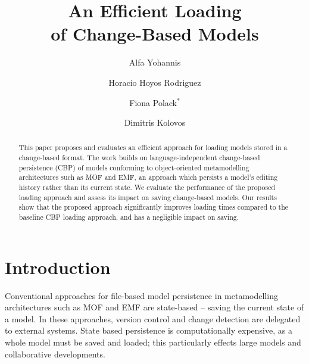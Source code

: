 \documentclass{llncs}
\begin{document}
    \renewcommand{\thelstlisting}{\arabic{lstlisting}}
    \renewcommand{\labelitemi}{$\bullet$}
    \newcommand{\dk}[1]{\textbf{[DK: #1]}}
    
    \title{An Efficient Loading \\ of Change-Based Models}
    \author{
Alfa Yohannis \and Horacio Hoyos Rodriguez \and Fiona Polack$^*$ \and Dimitris Kolovos
    }
    
    
    \maketitle      %
    \begin{abstract}
This paper proposes and evaluates an efficient approach for loading models stored in a change-based format. The work builds on language-independent change-based persistence (CBP) of models conforming to object-oriented metamodelling architectures such as MOF and EMF, an approach which persists a model's editing history rather than its current state. We evaluate the performance of the proposed loading approach and assess its impact on saving change-based models. Our results show that the proposed approach significantly improves loading times compared to the baseline CBP loading approach, and has a negligible impact on saving.

    \end{abstract}
    
    \section{Introduction}
    \label{sec:introduction}
    Conventional approaches for file-based model persistence in metamodelling architectures such as MOF \cite{omg2018mof} and EMF \cite{steinberg2008emf} are state-based -- saving the current state of a model.  In these approaches,  version control and change detection are delegated to external systems.  State based persistence is computationally expensive, as a whole model must be saved and loaded; this particularly effects large models and collaborative developments.
    
\end{document}
